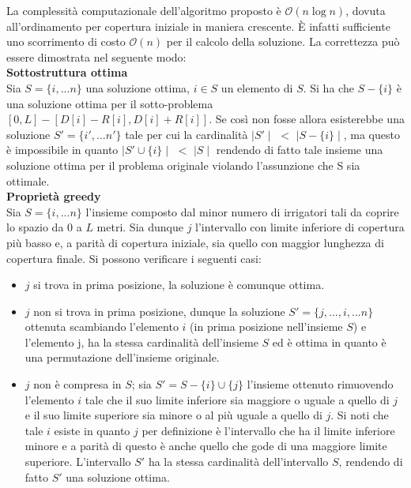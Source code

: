 \documentclass[../cheatSheetAlgoritmi.tex]{subfiles}
\begin{document}
La complessità computazionale dell'algoritmo proposto è $\mathcal{O}(n\log n)$, dovuta all'ordinamento per copertura iniziale in maniera crescente. È infatti sufficiente uno scorrimento di costo $\mathcal{O}(n)$ per il calcolo della soluzione.
La correttezza può essere dimostrata nel seguente modo: \\
\textbf{Sottostruttura ottima} \\
Sia $S = \{i, ... n\}$ una soluzione ottima, $i \in S$ un elemento di $S$. Si ha che $S - \{i\}$ è una soluzione ottima per il sotto-problema $[0, L] - [D[i] - R[i], D[i] + R[i]]$. Se così non fosse allora esisterebbe una soluzione $S' = \{i', ... n'\}$ tale per cui la cardinalità $\mid S' \mid$ $<$ $\mid S - \{i\} \mid$, ma questo è impossibile in quanto $\mid S' \cup \{i\} \mid$ $<$ $\mid S \mid$ rendendo di fatto tale insieme una soluzione ottima per il problema originale violando l'assunzione che S sia ottimale.\\
\textbf{Proprietà greedy} \\
Sia $S = \{i, ... n\}$ l'insieme composto dal minor numero di irrigatori tali da coprire lo spazio da 0 a $L$ metri. Sia dunque $j$ l'intervallo con limite inferiore di copertura più basso e, a parità di copertura iniziale, sia quello con maggior lunghezza di copertura finale. Si possono verificare i seguenti casi:
\begin{itemize}
    \item $j$ si trova in prima posizione, la soluzione è comunque ottima.
    \item $j$ non si trova in prima posizione, dunque la soluzione $S' = \{j, ..., i, ... n\}$ ottenuta scambiando l'elemento $i$ (in prima posizione nell'insieme $S$) e l'elemento j, ha la stessa cardinalità dell'insieme $S$ ed è ottima in quanto è una permutazione dell'insieme originale.
    \item $j$ non è compresa in $S$; sia $S' = S - \{i\} \cup \{j\}$ l'insieme ottenuto rimuovendo l'elemento $i$ tale che il suo limite inferiore sia maggiore o uguale a quello di $j$ e il suo limite superiore sia minore o al più uguale a quello di $j$. Si noti che tale $i$ esiste in quanto $j$ per definizione è l'intervallo che ha il limite inferiore minore e a parità di questo è anche quello che gode di una maggiore limite superiore. L'intervallo $S'$ ha la stessa cardinalità dell'intervallo $S$, rendendo di fatto $S'$ una soluzione ottima.
\end{itemize}
\newpage
\end{document}
